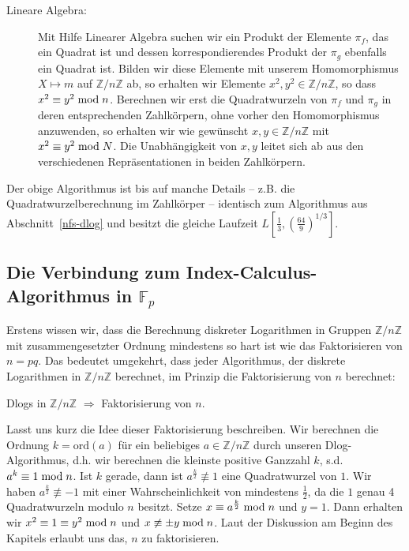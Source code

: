 \begin{refsegment}
\begin{description}
\item[Lineare Algebra:] Mit Hilfe Linearer Algebra suchen wir ein Produkt der Elemente $\pi_f$, das ein Quadrat ist und dessen korrespondierendes Produkt der $\pi_g$ ebenfalls ein Quadrat ist. Bilden wir diese Elemente mit unserem Homomorphismus $X \mapsto m$ auf $\mathbb{Z}/n\mathbb{Z}$ ab, so erhalten wir Elemente $x^2,y^2 \in \mathbb{Z}/n\mathbb{Z}$, so dass $x^2 \equiv y^2 \hspace{1mm}{\rm mod}\hspace{1mm} n$. Berechnen wir erst die Quadratwurzeln von $\pi_f$ und $\pi_g$ in deren entsprechenden Zahlkörpern, ohne vorher den Homomorphismus anzuwenden, so erhalten wir wie gewünscht $x, y \in \mathbb{Z}/n\mathbb{Z}$ mit $x^2 \equiv y^2 \hspace{1mm}{\rm mod}\hspace{1mm} N$. Die Unabhängigkeit von $x,y$ leitet sich ab aus den verschiedenen Repräsentationen in beiden Zahlkörpern.
\end{description}

Der obige Algorithmus ist bis auf manche Details -- z.B. die Quadratwurzelberechnung im Zahlkörper -- identisch zum Algorithmus aus Abschnitt~\ref{nfs-dlog} und besitzt die gleiche Laufzeit $L[\frac 1
3,\left(\frac{64}{9}\right)^{1/3}]$.


\subsection{\texorpdfstring{Die Verbindung zum Index-Calculus-Algorithmus in $\mathbb{F}_p$}{Die Verbindung zum Index-Calculus-Algorithmus in Fp}}

Erstens wissen wir, dass die Berechnung diskreter Logarithmen in Gruppen $\mathbb{Z}/n\mathbb{Z}$ mit zusammengesetzter Ordnung mindestens so hart ist wie das Faktorisieren von $n=pq$. Das bedeutet umgekehrt, dass jeder Algorithmus, der diskrete Logarithmen in $\mathbb{Z}/n\mathbb{Z}$ berechnet, im Prinzip die Faktorisierung von $n$ berechnet:
\begin{center}
  Dlogs in $\mathbb{Z}/n\mathbb{Z}$ $\Rightarrow$ Faktorisierung von $n$.
\end{center}

Lasst uns kurz die Idee dieser Faktorisierung beschreiben. Wir berechnen die Ordnung $k=\textrm{ord}(a)$ für ein beliebiges $a \in \mathbb{Z}/n\mathbb{Z}$ durch unseren Dlog-Algorithmus, d.h. wir berechnen die kleinste positive Ganzzahl $k$, s.d. $a^{k} \equiv 1 \hspace{1mm}{\rm mod}\hspace{1mm} n$. Ist $k$ gerade, dann ist $a^{\frac k 2} \not\equiv 1$ eine Quadratwurzel von $1$. Wir haben $a^{\frac k 2} \not\equiv -1$ mit einer Wahrscheinlichkeit von mindestens $\frac 1 2$, da die $1$ genau 4 Quadratwurzeln modulo $n$ besitzt. Setze $x \equiv a^{\frac k 2} \hspace{1mm}{\rm mod}\hspace{1mm} n$ und $y = 1$. Dann erhalten wir $x^2 \equiv 1 \equiv y^2 \hspace{1mm}{\rm mod}\hspace{1mm} n$ und $x \not \equiv \pm y \hspace{1mm}{\rm mod}\hspace{1mm} n$. Laut der Diskussion am Beginn des Kapitels erlaubt uns das, $n$ zu faktorisieren.\\[0.1cm]


\end{refsegment}
